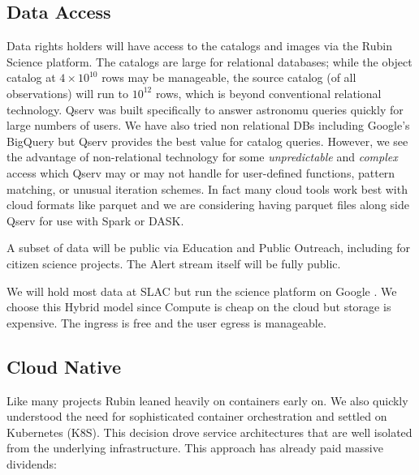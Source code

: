 \documentclass[11pt,twoside]{article}
\begin{document}
\begin{centering}
\end{centering}


\subsection{Data Access} \label{sec:dataaccess}

Data rights holders will have access to the catalogs and images via the Rubin Science platform.
The catalogs are large for relational databases; while the object catalog at $4 \times 10^{10}$ rows may be manageable,
the source catalog (of all observations) will run to $10^{12}$ rows, which is beyond conventional relational technology.
Qserv  \citep{C15_adassxxxii} was built specifically to answer astronomu queries quickly for large numbers of users.
We have also tried non relational DBs including Google's BigQuery \citet[e.g.,][]{Document-31100} but Qserv  provides the best value for catalog queries.
However, we see the advantage of non-relational technology for
some \emph{unpredictable} and \emph{complex} access which Qserv  may or may not handle for user-defined functions, pattern matching, or unusual iteration schemes.
In fact many cloud tools work best with cloud formats like parquet and
 we are considering having parquet files along side Qserv for use with Spark or DASK.

A subset of data will be public via Education and Public Outreach, including for citizen science projects.
The Alert stream itself will be fully public.

We will hold most data at SLAC but run the science platform on Google \citep{2021arXiv211115030O}.
We choose this Hybrid model since Compute is cheap on the cloud but storage is expensive.
The ingress is free and the user egress is manageable.

\subsection{Cloud Native}\label{sec:cloudnative}
Like many projects \citep{2017ASPC..512...33O} Rubin leaned heavily on containers early on.
We also quickly understood the need for sophisticated container orchestration and settled on Kubernetes (K8S).
This decision drove service architectures that are well isolated from the underlying infrastructure.
This approach has already paid massive dividends:
\end{document}
